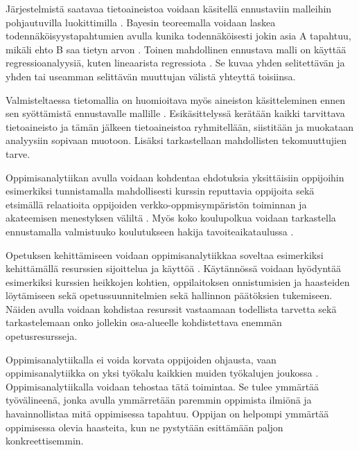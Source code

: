 Järjestelmistä saatavaa tietoaineistoa voidaan käsitellä ennustaviin malleihin pohjautuvilla luokittimilla \citep{hamalainenClassifiersEducationalData2010}. Bayesin teoreemalla voidaan laskea todennäköisyystapahtumien avulla kunika todennäköisesti jokin asia A tapahtuu, mikäli ehto B saa tietyn arvon \citep{natinggaDataScienceAlgorithms2018}. Toinen mahdollinen ennustava malli on käyttää regressioanalyysiä, kuten lineaarista regressiota \citep{rossIntroductoryStatistics2017}. Se kuvaa yhden selitettävän ja yhden tai useamman selittävän muuttujan välistä yhteyttä toisiinsa.

Valmisteltaessa tietomallia on huomioitava myös aineiston käsitteleminen ennen sen syöttämistä ennustavalle mallille \citep{romeroSurveyPreProcessingEducational2014, rossIntroductoryStatistics2017}. Esikäsittelyssä kerätään kaikki tarvittava tietoaineisto ja tämän jälkeen tietoaineistoa ryhmitellään, siistitään ja muokataan analyysiin sopivaan muotoon. Lisäksi tarkastellaan mahdollisten tekomuuttujien tarve.

Oppimisanalytiikan avulla voidaan kohdentaa ehdotuksia yksittäisiin oppijoihin esimerkiksi tunnistamalla mahdollisesti kurssin reputtavia oppijoita \citep{barberCourseCorrectionUsing2012} sekä etsimällä relaatioita oppijoiden verkko-oppmisympäristön toiminnan ja akateemisen menestyksen väliltä \citep{agudo-peregrinaCanWePredict2014}. Myös koko koulupolkua voidaan tarkastella ennustamalla valmistuuko koulutukseen hakija tavoiteaikataulussa \citep{barberCourseCorrectionUsing2012a}.

Opetuksen kehittämiseen voidaan oppimisanalytiikkaa soveltaa esimerkiksi kehittämällä resurssien sijoittelua ja käyttöä \citep{longPenetratingFogAnalytics2011, romeroEducationalDataMining2010}. Käytännössä voidaan hyödyntää esimerkiksi kurssien heikkojen kohtien, oppilaitoksen onnistumisien ja haasteiden löytämiseen sekä opetussuunnitelmien sekä hallinnon päätöksien tukemiseen. Näiden avulla voidaan kohdistaa resurssit vastaamaan todellista tarvetta sekä tarkastelemaan onko jollekin osa-alueelle kohdistettava enemmän opetusresursseja.

Oppimisanalytiikalla ei voida korvata oppijoiden ohjausta, vaan oppimisanalytiikka on yksi työkalu kaikkien muiden työkalujen joukossa \citep{auvinenOppimisanalytiikkaTuleeOletko2017}. Oppimisanalytiikalla voidaan tehostaa tätä toimintaa. Se tulee ymmärtää työvälineenä, jonka avulla ymmärretään paremmin oppimista ilmiönä ja havainnollistaa mitä oppimisessa tapahtuu. Oppijan on helpompi ymmärtää oppimisessa olevia haasteita, kun ne pystytään esittämään paljon konkreettisemmin.
